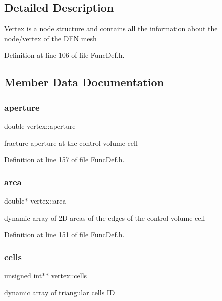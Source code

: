 \subsection{Detailed Description}
Vertex is a node structure and contains all the information about the node/vertex of the D\+FN mesh 

Definition at line 106 of file Func\+Def.\+h.



\subsection{Member Data Documentation}
\mbox{\label{structvertex_a7588fad77cf759d8db0957c9e957e23a}} 
\subsubsection{\texorpdfstring{aperture}{aperture}}
{\footnotesize\ttfamily double vertex\+::aperture}

fracture aperture at the control volume cell 

Definition at line 157 of file Func\+Def.\+h.

\mbox{\label{structvertex_aff6495cfbefb8dffd8714d7c68810ca6}} 
\subsubsection{\texorpdfstring{area}{area}}
{\footnotesize\ttfamily double$\ast$ vertex\+::area}

dynamic array of 2D areas of the edges of the control volume cell 

Definition at line 151 of file Func\+Def.\+h.

\mbox{\label{structvertex_a583032cadaa99e8f5c044d3bd10191cf}} 
\subsubsection{\texorpdfstring{cells}{cells}}
{\footnotesize\ttfamily unsigned int$\ast$$\ast$ vertex\+::cells}

dynamic array of triangular cells ID 

